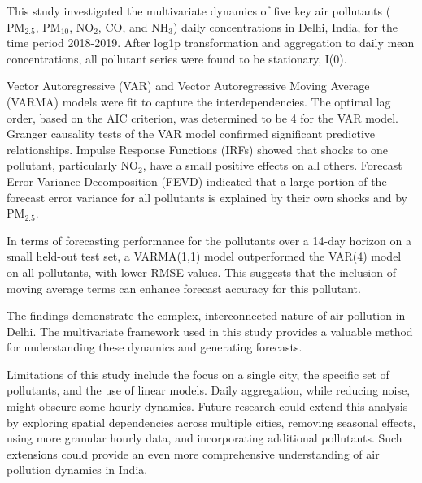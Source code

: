 \documentclass[fleqn,10pt]{SelfArx} %
\begin{document}
This study investigated the multivariate dynamics of five key air pollutants ($\text{PM}_{2.5}$, $\text{PM}_{10}$, $\text{NO}_2$, CO, and $\text{NH}_3$) daily concentrations in Delhi, India, for the time period 2018-2019. After log1p transformation and aggregation to daily mean concentrations, all pollutant series were found to be stationary, I(0).

Vector Autoregressive (VAR) and Vector Autoregressive Moving Average (VARMA) models were fit to capture the interdependencies. The optimal lag order, based on the AIC criterion, was determined to be 4 for the VAR model. Granger causality tests of the VAR model confirmed significant predictive relationships. Impulse Response Functions (IRFs) showed that shocks to one pollutant, particularly $\text{NO}_{2}$, have a small positive effects on all others. Forecast Error Variance Decomposition (FEVD) indicated that a large portion of the forecast error variance for all pollutants is explained by their own shocks and by $\text{PM}_{2.5}$.

In terms of forecasting performance for the pollutants over a 14-day horizon on a small held-out test set, a VARMA(1,1) model outperformed the VAR(4) model on all pollutants, with lower RMSE values. This suggests that the inclusion of moving average terms can enhance forecast accuracy for this pollutant.

The findings demonstrate the complex, interconnected nature of air pollution in Delhi. The multivariate framework used in this study provides a valuable method for understanding these dynamics and generating forecasts.

Limitations of this study include the focus on a single city, the specific set of pollutants, and the use of linear models. Daily aggregation, while reducing noise, might obscure some hourly dynamics. Future research could extend this analysis by exploring spatial dependencies across multiple cities, removing seasonal effects, using more granular hourly data, and incorporating additional pollutants. Such extensions could provide an even more comprehensive understanding of air pollution dynamics in India.


\end{document}
